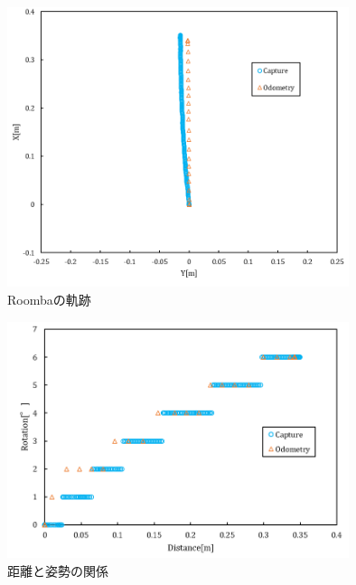 \documentclass[a4paper,11pt]{jsarticle}
\begin{document}
\begin{figure}[H] %
        \begin{center}
        \includegraphics[width=100mm]{../graph/Xvs.Y.png}
        \caption{Roombaの軌跡}%
        \label{fig:1}
        \end{center}
\end{figure}
\begin{figure}[H] %
        \begin{center}
        \includegraphics[width=100mm]{../graph/Rotationvs.Distance.png}
        \caption{距離と姿勢の関係}%
        \label{fig:2}
        \end{center}
\end{figure}
\end{document}
